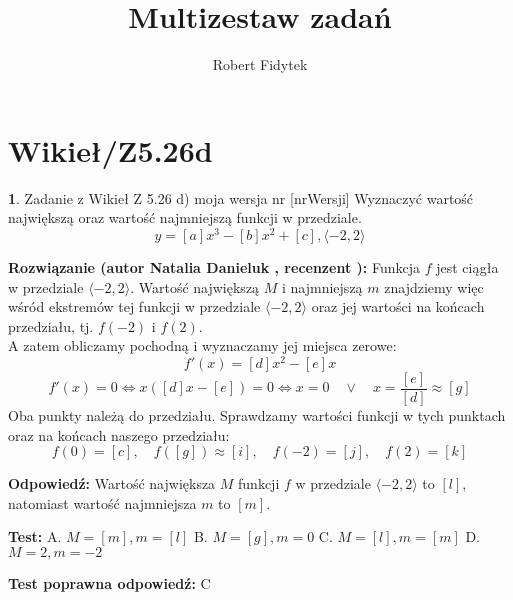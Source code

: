 \documentclass[12pt, a4paper]{article}
\title{Multizestaw zadań}
\author{Robert Fidytek}
\date{}
\theoremstyle{definition} %
\newtheorem{zad}{}
\newcommand{\kategoria}[1]{\section{#1}} %
\newcommand{\zadStart}[1]{\begin{zad}#1\newline} %
\newcommand{\zadStop}{\end{zad}}   %
\newcommand{\rozwStart}[2]{\noindent \textbf{Rozwiązanie (autor #1 , recenzent #2): }\newline} %
\newcommand{\rozwStop}{\newline}                                            %
\newcommand{\odpStart}{\noindent \textbf{Odpowiedź:}\newline}    %
\newcommand{\odpStop}{\newline}                                             %
\newcommand{\testStart}{\noindent \textbf{Test:}\newline} %
\newcommand{\testStop}{\newline} %
\newcommand{\kluczStart}{\noindent \textbf{Test poprawna odpowiedź:}\newline} %
\newcommand{\kluczStop}{\newline} %
\begin{document}
\maketitle

\kategoria{Wikieł/Z5.26d}

\zadStart{Zadanie z Wikieł Z 5.26 d) moja wersja nr [nrWersji]}
Wyznaczyć wartość największą oraz wartość najmniejszą funkcji w przedziale. 
$$y = [a]x^3 - [b]x^2 + [c], \langle-2,2\rangle$$
\zadStop

\rozwStart{Natalia Danieluk}{}
Funkcja $f$ jest ciągła w przedziale $\langle-2,2\rangle$. Wartość największą $M$ i najmniejszą $m$ znajdziemy więc wśród ekstremów tej funkcji w przedziale $\langle-2,2\rangle$ oraz jej wartości na końcach przedziału, tj. $f(-2)$ i $f(2)$. \\
A zatem obliczamy pochodną i wyznaczamy jej miejsca zerowe:
$$ f'(x) = [d]x^2 - [e]x $$
$$ f'(x) = 0 \Leftrightarrow x([d]x - [e]) = 0 \Leftrightarrow x = 0 \quad \lor \quad x = \frac{[e]}{[d]} \approx [g] $$ 
Oba punkty należą do przedziału. Sprawdzamy wartości funkcji w tych punktach oraz na końcach naszego przedziału: \\
$$ f(0) = [c],\quad f([g]) \approx [i],\quad f(-2) = [j],\quad f(2) = [k] $$
\rozwStop

\odpStart
Wartość największa $M$ funkcji $f$ w przedziale $\langle-2,2\rangle$ to $[l]$, natomiast wartość najmniejsza $m$ to $[m]$.
\odpStop

\testStart
A. $M=[m], m=[l]$
B. $M=[g], m=0$
C. $M=[l], m=[m]$
D. $M=2, m=-2$
\testStop

\kluczStart
C
\kluczStop
\end{document}
